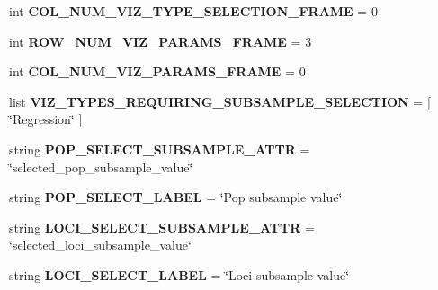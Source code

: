 \begin{DoxyCompactItemize}
\item 
int {\bfseries C\+O\+L\+\_\+\+N\+U\+M\+\_\+\+V\+I\+Z\+\_\+\+T\+Y\+P\+E\+\_\+\+S\+E\+L\+E\+C\+T\+I\+O\+N\+\_\+\+F\+R\+A\+ME} = 0\hypertarget{namespacenegui_1_1pgguiviz_ab4461231838fb2a4c38411c05873dc13}{}\label{namespacenegui_1_1pgguiviz_ab4461231838fb2a4c38411c05873dc13}

\item 
int {\bfseries R\+O\+W\+\_\+\+N\+U\+M\+\_\+\+V\+I\+Z\+\_\+\+P\+A\+R\+A\+M\+S\+\_\+\+F\+R\+A\+ME} = 3\hypertarget{namespacenegui_1_1pgguiviz_a8a052cb98da491c0e370fdd751815298}{}\label{namespacenegui_1_1pgguiviz_a8a052cb98da491c0e370fdd751815298}

\item 
int {\bfseries C\+O\+L\+\_\+\+N\+U\+M\+\_\+\+V\+I\+Z\+\_\+\+P\+A\+R\+A\+M\+S\+\_\+\+F\+R\+A\+ME} = 0\hypertarget{namespacenegui_1_1pgguiviz_ae07e60367e12b02fc39a1e1230daf084}{}\label{namespacenegui_1_1pgguiviz_ae07e60367e12b02fc39a1e1230daf084}

\item 
list {\bfseries V\+I\+Z\+\_\+\+T\+Y\+P\+E\+S\+\_\+\+R\+E\+Q\+U\+I\+R\+I\+N\+G\+\_\+\+S\+U\+B\+S\+A\+M\+P\+L\+E\+\_\+\+S\+E\+L\+E\+C\+T\+I\+ON} = \mbox{[} \char`\"{}Regression\char`\"{} \mbox{]}\hypertarget{namespacenegui_1_1pgguiviz_ad42d7e652711c841bf8ccc9c81978d24}{}\label{namespacenegui_1_1pgguiviz_ad42d7e652711c841bf8ccc9c81978d24}

\item 
string {\bfseries P\+O\+P\+\_\+\+S\+E\+L\+E\+C\+T\+\_\+\+S\+U\+B\+S\+A\+M\+P\+L\+E\+\_\+\+A\+T\+TR} = \char`\"{}selected\+\_\+pop\+\_\+subsample\+\_\+value\char`\"{}\hypertarget{namespacenegui_1_1pgguiviz_a104c1770e7076ca6ff99ded3672843ca}{}\label{namespacenegui_1_1pgguiviz_a104c1770e7076ca6ff99ded3672843ca}

\item 
string {\bfseries P\+O\+P\+\_\+\+S\+E\+L\+E\+C\+T\+\_\+\+L\+A\+B\+EL} = \char`\"{}Pop subsample value\char`\"{}\hypertarget{namespacenegui_1_1pgguiviz_a98e262088dbdc8d7f53730b1b1285cd4}{}\label{namespacenegui_1_1pgguiviz_a98e262088dbdc8d7f53730b1b1285cd4}

\item 
string {\bfseries L\+O\+C\+I\+\_\+\+S\+E\+L\+E\+C\+T\+\_\+\+S\+U\+B\+S\+A\+M\+P\+L\+E\+\_\+\+A\+T\+TR} = \char`\"{}selected\+\_\+loci\+\_\+subsample\+\_\+value\char`\"{}\hypertarget{namespacenegui_1_1pgguiviz_ad7a47c4bfe2880448a2a8db9eae755bb}{}\label{namespacenegui_1_1pgguiviz_ad7a47c4bfe2880448a2a8db9eae755bb}

\item 
string {\bfseries L\+O\+C\+I\+\_\+\+S\+E\+L\+E\+C\+T\+\_\+\+L\+A\+B\+EL} = \char`\"{}Loci subsample value\char`\"{}\hypertarget{namespacenegui_1_1pgguiviz_a1f7b59cd000ac7d75c8f0688fd439dfe}{}\label{namespacenegui_1_1pgguiviz_a1f7b59cd000ac7d75c8f0688fd439dfe}


\end{DoxyCompactItemize}
